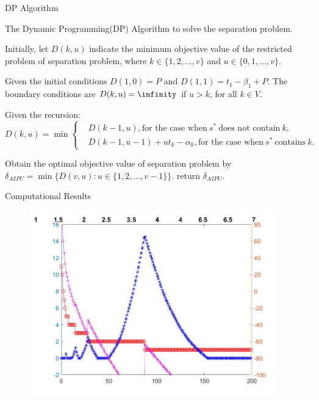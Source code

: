 \documentclass[14pt]{beamer}
\begin{document}
\begin{frame}{DP Algorithm}
	\begin{block}
		{The Dynamic Programming(DP) Algorithm to solve the separation problem.}
	\end{block}
	\begin{description}
	\justifying
	\footnotesize
	\item[Step 1.] Initially, let $D(k,u)$ indicate the minimum objective value of the restricted problem of separation problem, where $k\in \{1,2,\ldots,v\}$ and $u\in \{0,1,\ldots,v\}$.
	\item[Step 2.] Given the initial conditions $D(1,0) = P$ and $D(1,1) = t_1 - \beta_1 +P$. The boundary conditions are $D(k,u) = \infinity$ if $u > k$, for all $k \in V$.
	\item[Step 3.] Given the recursion:
	\begin{equation*}
	D(k,u)= \min \left\{
	\begin{aligned}
	& D(k-1,u), \text{for the case when} \ s^* \ \text{does not contain} \ k, \\
	& D(k-1,u-1) + u t_k - \alpha_k ,\text{for the case when} \ s^* \ \text{contains} \ k.
	\end{aligned}
	\right.
	\end{equation*}

\item[Step 4.] Obtain the optimal objective value of separation problem by
$\delta_{AIPU} = \min\{D(v,u): u\in \{1,2,\ldots,v-1\}\}$.
 return $\delta_{AIPU}$.
\end{description}

\end{frame}

\begin{frame}{Computational Results}
	\vspace{-3mm}
	\begin{figure}[H]
	\centering
	\includegraphics[width=0.95\textwidth]{Figures/Image30}
	\end{figure}
	\centering
\end{frame}
\end{document}
